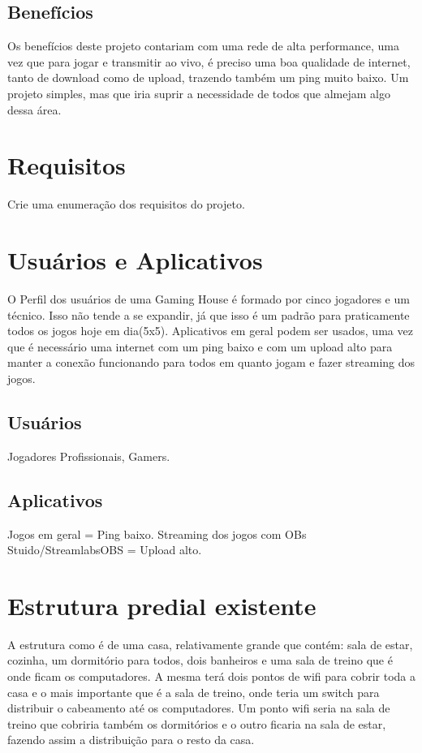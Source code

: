 \documentclass[	DIV=calc,%
							paper=a4,%
							fontsize=12pt,%
							onecolumn]{scrartcl}	 					%
\begin{document}
\subsection{Benefícios}
	Os benefícios deste projeto contariam com uma rede de alta performance, uma vez que para jogar e transmitir ao vivo, é preciso uma boa qualidade de internet, tanto de download como de upload, trazendo também um ping muito baixo. Um projeto simples, mas que iria suprir a necessidade de todos que almejam algo dessa área.

\section{Requisitos}
Crie uma enumeração dos requisitos do projeto.

\section{Usuários e Aplicativos}
	O Perfil dos usuários de uma Gaming House é formado por cinco jogadores e um técnico. Isso não tende a se expandir, já que isso é um padrão para praticamente todos os jogos hoje em dia(5x5). Aplicativos em geral podem ser usados, uma vez que é necessário uma internet com um ping baixo e com um upload alto para manter a conexão funcionando para todos em quanto jogam e fazer streaming dos jogos.
 

\subsection{Usuários}
	Jogadores Profissionais, Gamers.

\subsection{Aplicativos}
Jogos em geral = Ping baixo.
Streaming dos jogos com OBs Stuido/StreamlabsOBS = Upload alto.

\section{Estrutura predial existente}
	A estrutura como é de uma casa, relativamente grande que contém: sala de estar, cozinha, um dormitório para todos, dois banheiros e uma sala de treino que é onde ficam os computadores. A mesma terá dois pontos de wifi para cobrir toda a casa e o mais importante que é a sala de treino, onde teria um switch para distribuir o cabeamento até os computadores. Um ponto wifi seria na sala de treino que cobriria também os dormitórios e o outro ficaria na sala de estar, fazendo assim a distribuição para o resto da casa.
\end{document}
